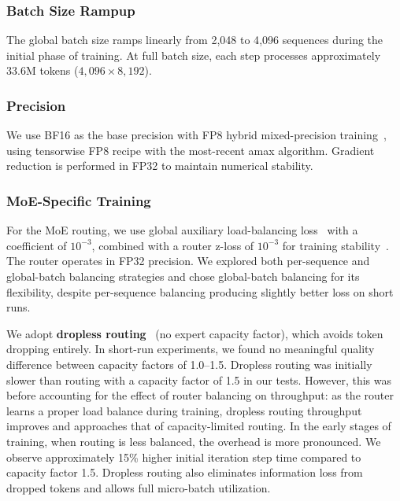 \documentclass{llmxive}
\begin{document}
\subsubsection{Batch Size Rampup}

The global batch size ramps linearly from 2{,}048 to 4{,}096 sequences during
the initial phase of training. At full batch size, each step processes
approximately 33.6M tokens ($4{,}096 \times 8{,}192$).

\subsubsection{Precision}
\label{sec:precision}

We use BF16 as the base precision with FP8 hybrid mixed-precision
training~\cite{micikevicius2022fp8}, using tensorwise FP8 recipe with the
most-recent amax algorithm. Gradient reduction is performed in FP32 to maintain
numerical stability.

\subsubsection{MoE-Specific Training}

For the MoE routing, we use global auxiliary load-balancing
loss~\cite{fedus2022switch} with a coefficient of $10^{-3}$, combined with
a router z-loss of $10^{-3}$ for training stability~\cite{zoph2022stmoe}. The router operates in
FP32 precision. We explored both per-sequence and global-batch balancing strategies and
chose global-batch balancing for its flexibility, despite per-sequence balancing producing slightly better loss on short runs.

We adopt \textbf{dropless routing}~\cite{gale2023megablocks} (no expert capacity factor), which avoids
token dropping entirely. In short-run experiments, we found no meaningful
quality difference between capacity factors of 1.0--1.5. Dropless routing
was initially slower than routing with a capacity factor of 1.5 in our tests.
However, this was before accounting for the effect of router balancing on
throughput: as the router learns a proper load balance during training,
dropless routing throughput improves and approaches that of capacity-limited
routing. In the early stages of training, when routing is less balanced, the
overhead is more pronounced. We observe approximately
15\% higher initial iteration step time compared to capacity factor 1.5. Dropless routing
also eliminates information loss from dropped tokens and allows full
micro-batch utilization.
\end{document}
